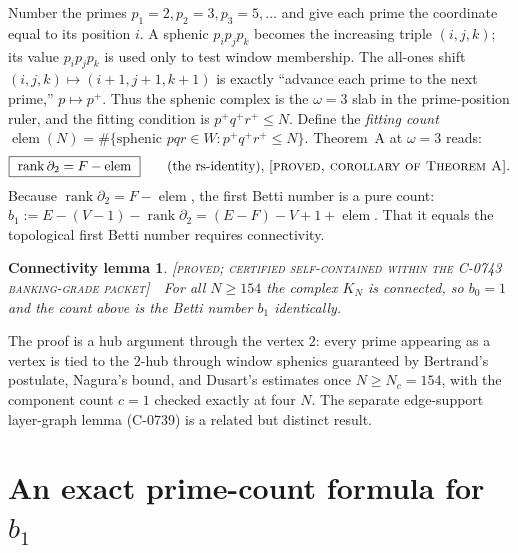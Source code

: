 \documentclass[11pt,reqno]{amsart}
\theoremstyle{plain}
\theoremstyle{definition}
\theoremstyle{plain}
\newtheorem*{connlem}{Connectivity lemma}
\newcommand{\rank}{\operatorname{rank}}
\newcommand{\elem}{\operatorname{elem}}
\newcommand{\st}{\textsc}
\begin{document}
Number the primes $p_1=2,p_2=3,p_3=5,\dots$ and give each prime the coordinate equal to its
position $i$. A sphenic $p_ip_jp_k$ becomes the increasing triple $(i,j,k)$; its value
$p_ip_jp_k$ is used only to test window membership. The all-ones shift
$(i,j,k)\mapsto(i+1,j+1,k+1)$ is exactly ``advance each prime to the next prime,'' $p\mapsto
p^+$. Thus the sphenic complex is the $\omega=3$ slab in the prime-position ruler, and the
fitting condition is $p^+q^+r^+\le N$. Define the \emph{fitting count}
$\elem(N)=\#\{\text{sphenic }pqr\in W: p^+q^+r^+\le N\}$. Theorem~A at $\omega=3$ reads:
\[
\boxed{\ \rank\partial_2=F-\elem\ }\qquad\text{(the rs-identity), \st{[proved, corollary of Theorem~A]}.}
\]
Because $\rank\partial_2=F-\elem$, the first Betti number is a pure count:
$b_1:=E-(V-1)-\rank\partial_2=(E-F)-V+1+\elem$. That it equals the topological first Betti
number requires connectivity.
\begin{connlem}
\textnormal{\st{[proved; certified self-contained within the C-0743 banking-grade packet]}}\ \
For all $N\ge154$ the complex $K_N$ is connected, so $b_0=1$ and the count above is the Betti
number $b_1$ identically.
\end{connlem}
\noindent The proof is a hub argument through the vertex $2$: every prime appearing as a vertex
is tied to the $2$-hub through window sphenics guaranteed by Bertrand's postulate, Nagura's
bound, and Dusart's estimates once $N\ge N_c=154$, with the component count $c=1$ checked
exactly at four $N$. The separate edge-support layer-graph lemma (C-0739) is a related but
distinct result.

\section{An exact prime-count formula for $b_1$}\label{sec:formula}
\end{document}
